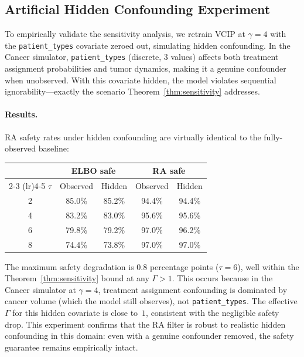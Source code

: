 \documentclass{article}
\begin{document}
\subsection{Artificial Hidden Confounding Experiment}
\label{app:artificial_confounding}

To empirically validate the sensitivity analysis, we retrain VCIP at $\gamma = 4$ with the \texttt{patient\_types} covariate zeroed out, simulating hidden confounding. In the Cancer simulator, \texttt{patient\_types} (discrete, 3 values) affects both treatment assignment probabilities and tumor dynamics, making it a genuine confounder when unobserved. With this covariate hidden, the model violates sequential ignorability---exactly the scenario Theorem~\ref{thm:sensitivity} addresses.

\paragraph{Results.} RA safety rates under hidden confounding are virtually identical to the fully-observed baseline:

\begin{center}
\small
\begin{tabular}{c cc cc}
\toprule
& \multicolumn{2}{c}{ELBO safe} & \multicolumn{2}{c}{RA safe} \\
\cmidrule(lr){2-3} \cmidrule(lr){4-5}
$\tau$ & Observed & Hidden & Observed & Hidden \\
\midrule
2 & 85.0\% & 85.2\% & 94.4\% & 94.4\% \\
4 & 83.2\% & 83.0\% & 95.6\% & 95.6\% \\
6 & 79.8\% & 79.2\% & 97.0\% & 96.2\% \\
8 & 74.4\% & 73.8\% & 97.0\% & 97.0\% \\
\bottomrule
\end{tabular}
\end{center}

The maximum safety degradation is $0.8$ percentage points ($\tau = 6$), well within the Theorem~\ref{thm:sensitivity} bound at any $\Gamma > 1$. This occurs because in the Cancer simulator at $\gamma = 4$, treatment assignment confounding is dominated by cancer volume (which the model still observes), not \texttt{patient\_types}. The effective $\Gamma$ for this hidden covariate is close to~$1$, consistent with the negligible safety drop. This experiment confirms that the RA filter is robust to realistic hidden confounding in this domain: even with a genuine confounder removed, the safety guarantee remains empirically intact.
\end{document}
